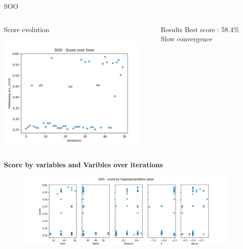 \begin{frame}[allowframebreaks]{SOO}
    
    \begin{columns}
    
        \begin{column}[t]{0.6\textwidth}
            \begin{block}{Score evolution}
                
                \includegraphics[width = 7.5cm]{imgs/plots/exp10_score_over_time.png}
            
            \end{block}   
        \end{column}

        \begin{column}[t]{0.4\textwidth}
            \begin{block}{Results}
                Best score : 58.4\%\\
                Slow convergence               
            \end{block}
            
            
        \end{column}
    \end{columns}   
    
    \framebreak

    \begin{columns}
    
        \begin{column}{0.65\textwidth}
            \textbf{Score by variables and Varibles over iterations}
                \begin{figure}[h]
                    \includegraphics[width = \textwidth]{imgs/plots/exp10_score_by_hp.png}
                \end{figure}     
        \end{column}


\end{columns}
\end{frame}
